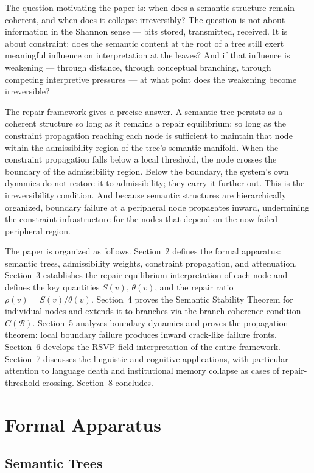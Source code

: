 \documentclass[11pt, a4paper]{article}
\theoremstyle{definition}
\theoremstyle{remark}
\begin{document}
The question motivating the paper is: when does a semantic structure remain
coherent, and when does it collapse irreversibly? The question is not about
information in the Shannon sense --- bits stored, transmitted, received. It is
about constraint: does the semantic content at the root of a tree still exert
meaningful influence on interpretation at the leaves? And if that influence
is weakening --- through distance, through conceptual branching, through
competing interpretive pressures --- at what point does the weakening become
irreversible?

The repair framework gives a precise answer. A semantic tree persists as a
coherent structure so long as it remains a repair equilibrium: so long as the
constraint propagation reaching each node is sufficient to maintain that node
within the admissibility region of the tree's semantic manifold. When the
constraint propagation falls below a local threshold, the node crosses the
boundary of the admissibility region. Below the boundary, the system's own
dynamics do not restore it to admissibility; they carry it further out. This
is the irreversibility condition. And because semantic structures are
hierarchically organized, boundary failure at a peripheral node propagates
inward, undermining the constraint infrastructure for the nodes that depend
on the now-failed peripheral region.

The paper is organized as follows. Section~2 defines the formal apparatus:
semantic trees, admissibility weights, constraint propagation, and attenuation.
Section~3 establishes the repair-equilibrium interpretation of each node and
defines the key quantities $S(v)$, $\theta(v)$, and the repair ratio
$\rho(v) = S(v)/\theta(v)$. Section~4 proves the Semantic Stability Theorem
for individual nodes and extends it to branches via the branch coherence
condition $C(\mathcal{B})$. Section~5 analyzes boundary dynamics and proves
the propagation theorem: local boundary failure produces inward crack-like
failure fronts. Section~6 develops the RSVP field interpretation of the entire
framework. Section~7 discusses the linguistic and cognitive applications, with
particular attention to language death and institutional memory collapse as
cases of repair-threshold crossing. Section~8 concludes.

\section{Formal Apparatus}

\subsection{Semantic Trees}
\end{document}
